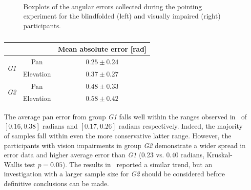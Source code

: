\documentclass{llncs}
\begin{document}

\begin{figure}[t]
  \centering
~
  \caption{Boxplots of the angular errors collected during the pointing experiment for the blindfolded (left) and visually impaired (right) participants. }
\end{figure}

\begin{table}
  \centering
  \caption{}\label{tab:results}
  \begin{tabular}{p{1cm}cc}
    \toprule
	                         &           & Mean absolute error [rad] \\ \midrule
    \multirow{2}{*}{\textit{G1}} & Pan       & $ 0.25\pm0.24$ \\
				 & Elevation & $ 0.37\pm0.27$ \\ \midrule
    \multirow{2}{*}{\textit{G2}} & Pan       & $ 0.48\pm0.33$ \\
				 & Elevation & $ 0.58\pm0.42$ \\
    \bottomrule
  \end{tabular}
\end{table}


The average pan error from group \textit{G1} falls well within the ranges observed in~\cite{macdonald2006spatial,schonstein2008comparison} of $[0.16, 0.38]$ radians and $[0.17, 0.26]$ radians respectively. 
Indeed, the majority of samples fall within even the more conservative latter range. 
However, the participants with vision impairments in group \textit{G2}  demonstrate a wider spread in error data and higher average error than \textit{G1} (0.23 vs. 0.40 radians, Kruskal-Wallis test $p=0.05$). 
The results in~\cite{katz2011spatial,zwiers2001spatial} reported a similar trend, but an investigation with a larger sample size for \textit{G2} should be considered before definitive conclusions can be made.
\end{document}
